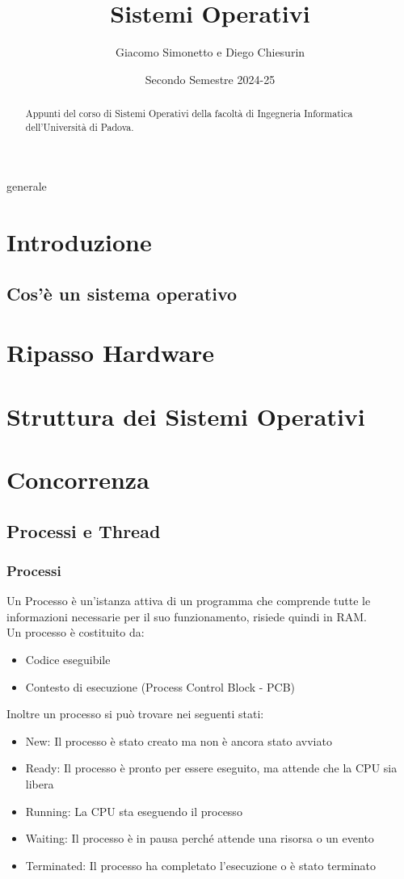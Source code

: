 \documentclass[a4paper]{article}
\title{Sistemi Operativi}
\author{Giacomo Simonetto e Diego Chiesurin}
\date{Secondo Semestre 2024-25}
\begin{document}
generale
\maketitle
\begin{abstract}
	Appunti del corso di Sistemi Operativi della facoltà di Ingegneria Informatica dell'Università di Padova.
\end{abstract}

\newpage

\tableofcontents                       %

\newpage



\section{Introduzione}
\subsection{Cos'è un sistema operativo}
\newpage
\section{Ripasso Hardware}
\newpage
\section{Struttura dei Sistemi Operativi}
\newpage
\section{Concorrenza}
\subsection{Processi e Thread}
\subsubsection*{Processi}
Un Processo è un'istanza attiva di un programma che comprende tutte le informazioni necessarie per il suo funzionamento, risiede quindi in RAM. \\
Un processo è costituito da: 
\begin{itemize}
	\item Codice eseguibile
	\item Contesto di esecuzione (Process Control Block - PCB)
\end{itemize}
Inoltre un processo si può trovare nei seguenti stati:
\begin{itemize}
	\item New: Il processo è stato creato ma non è ancora stato avviato
	\item Ready: Il processo è pronto per essere eseguito, ma attende che la CPU sia libera
	\item Running: La CPU sta eseguendo il processo
	\item Waiting: Il processo è in pausa perché attende una risorsa o un evento
	\item Terminated: Il processo ha completato l'esecuzione o è stato terminato
\end{itemize}
\end{document}
